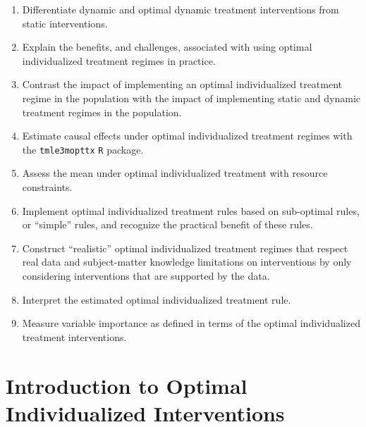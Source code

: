 \documentclass[
  12pt, krantz2,
]{krantz}
\newcommand{\passthrough}[1]{#1}
\providecommand{\tightlist}{%
  \setlength{\itemsep}{0pt}\setlength{\parskip}{0pt}}
\newcommand{\1}{\mathbbm{1}}
\theoremstyle{definition}
\theoremstyle{definition}
\theoremstyle{definition}
\theoremstyle{definition}
\theoremstyle{remark}
\begin{document}
\begin{enumerate}
\def\labelenumi{\arabic{enumi}.}
\tightlist
\item
  Differentiate dynamic and optimal dynamic treatment interventions from static
  interventions.
\item
  Explain the benefits, and challenges, associated with using optimal
  individualized treatment regimes in practice.
\item
  Contrast the impact of implementing an optimal individualized treatment
  regime in the population with the impact of implementing static and dynamic
  treatment regimes in the population.
\item
  Estimate causal effects under optimal individualized treatment regimes with
  the \passthrough{\lstinline!tmle3mopttx!} \passthrough{\lstinline!R!} package.
\item
  Assess the mean under optimal individualized treatment with resource
  constraints.
\item
  Implement optimal individualized treatment rules based on sub-optimal
  rules, or ``simple'' rules, and recognize the practical benefit of these rules.
\item
  Construct ``realistic'' optimal individualized treatment regimes that respect
  real data and subject-matter knowledge limitations on interventions by
  only considering interventions that are supported by the data.
\item
  Interpret the estimated optimal individualized treatment rule.
\item
  Measure variable importance as defined in terms of the optimal individualized
  treatment interventions.
\end{enumerate}

\hypertarget{introduction-to-optimal-individualized-interventions}{%
\section{Introduction to Optimal Individualized Interventions}\label{introduction-to-optimal-individualized-interventions}}
\end{document}
